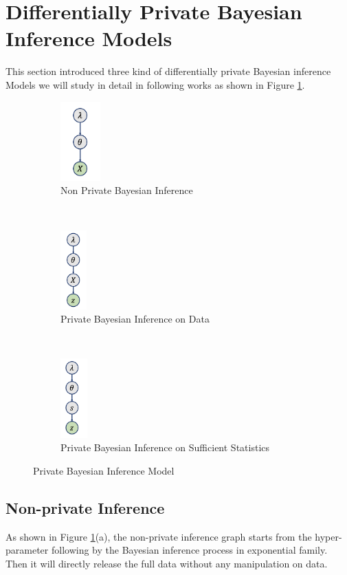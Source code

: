 \documentclass{article}
\begin{document}
\section{Differentially Private Bayesian Inference Models}
%
This section introduced three kind of differentially private Bayesian inference Models we will study in detail in following works as shown in Figure \ref{fig_pinfermodel}. 
\begin{figure}[t!]
    \centering
    \begin{subfigure}[t]{0.3\textwidth}
        \centering
        \includegraphics[height=1.2in]{nonp.png}
        \caption{Non Private Bayesian Inference}
    \end{subfigure}%
    ~ 
    \begin{subfigure}[t]{0.3\textwidth}
        \centering
        \includegraphics[height=1.2in]{pinfer}
        \caption{Private Bayesian Inference on Data}
    \end{subfigure}
    ~ 
    \begin{subfigure}[t]{0.3\textwidth}
        \centering
        \includegraphics[height=1.2in]{pinferons}
        \caption{Private Bayesian Inference on Sufficient Statistics}
    \end{subfigure}
    \caption{Private Bayesian Inference Model}
    \label{fig_pinfermodel}
\end{figure}
\subsection{Non-private Inference}
%
As shown in Figure \ref{fig_pinfermodel}(a), the non-private inference graph starts
from the hyper-parameter following by the Bayesian inference process in exponential family.
%
Then it will directly release the full data without any manipulation on data.
\end{document}
